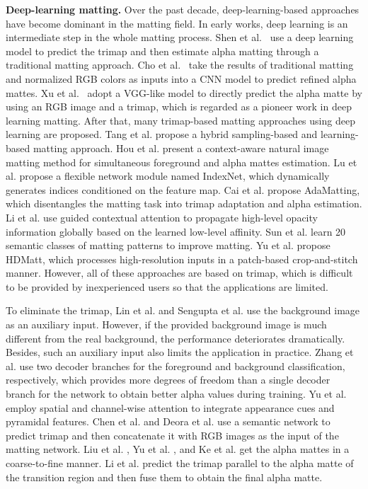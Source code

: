 \documentclass[10pt,twocolumn,letterpaper]{article}
\begin{document}
\textbf{Deep-learning matting.} Over the past decade, deep-learning-based approaches have become dominant in the matting field. In early works, deep learning is an intermediate step in the whole matting process. Shen et al.~\cite{shen2016deep} use a deep learning model to predict the trimap and then estimate alpha matting through a traditional matting approach. Cho et al.~\cite{cho2016natural} take the results of traditional matting and normalized RGB colors as inputs into a CNN model to predict refined alpha mattes. Xu et al.~\cite{xu2017deep} adopt a VGG-like model to directly predict the alpha matte by using an RGB image and a trimap, which is regarded as a pioneer work in deep learning matting. After that, many trimap-based matting approaches using deep learning are proposed. Tang et al. \cite{tang2019learning} propose a hybrid sampling-based and learning-based matting approach. Hou et al. \cite{hou2019context} present a context-aware natural image matting method for simultaneous foreground and alpha mattes estimation. Lu et al. \cite{lu2019indices} propose a flexible network module named IndexNet, which dynamically generates indices conditioned on the feature map. Cai et al. \cite{cai2019disentangled} propose AdaMatting, which disentangles the matting task into trimap adaptation and alpha estimation. Li et al. \cite{li2020natural} use guided contextual attention to propagate high-level opacity information globally based on the learned low-level affinity. Sun et al. \cite{sun2021semantic} learn 20 semantic classes of matting patterns to improve matting. Yu et al. \cite{yu2020high} propose HDMatt, which processes high-resolution inputs in a patch-based crop-and-stitch manner. However, all of these approaches are based on trimap, which is difficult to be provided by inexperienced users so that the applications are limited.

To eliminate the trimap, Lin et al. \cite{lin2021real} and Sengupta et al. \cite{sengupta2020background} use the background image as an auxiliary input. However, if the provided background image is much different from the real background, the performance deteriorates dramatically. Besides, such an auxiliary input also limits the application in practice. Zhang et al. \cite{zhang2019late} use two decoder branches for the foreground
and background classification, respectively, which provides more degrees of freedom than a single decoder branch for the network to obtain better
alpha values during training. Yu et al. \cite{qiao2020attention} employ spatial and channel-wise attention to integrate appearance cues and pyramidal features. Chen et al. \cite{chen2018semantic} and Deora et al. \cite{deora2021salient} use a semantic network to predict trimap and then concatenate it with RGB images as the input of the matting network. Liu et al. \cite{liu2020boosting}, Yu et al. \cite{yu2021cascade}, and Ke et al. \cite{ke2020green} get the alpha mattes in a coarse-to-fine manner. Li et al. \cite{li2022bridging,li2021deep} predict the trimap parallel to the alpha matte of the transition region and then fuse them to obtain the final alpha matte.
\end{document}

